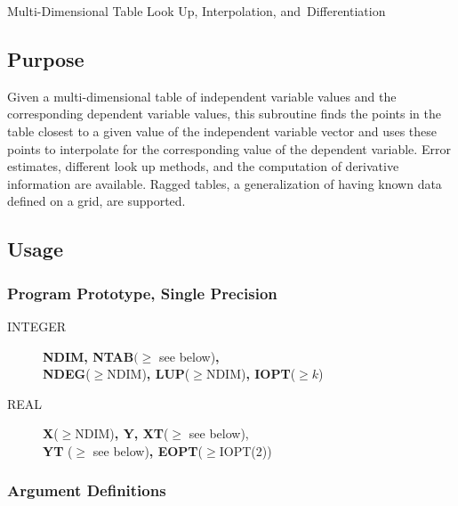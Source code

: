 \documentclass[twoside]{MATH77}
\begin{document}
 Multi-Dimensional Table Look Up, Interpolation,
\hbox{and Differentiation}


\subsection{Purpose}

Given a multi-dimensional table of independent variable values and the
corresponding dependent variable values, this subroutine finds the points in
the table closest to a given value of the independent variable vector and
uses these points to interpolate for the corresponding value of the
dependent variable. Error estimates, different look up methods, and the
computation of derivative information are available.  Ragged tables,
a generalization of having known data defined on a grid, are
supported.
\subsection{Usage}

\subsubsection{Program Prototype, Single Precision}
\begin{description}
\item[INTEGER]  {\bf NDIM, NTAB}$(\geq $ see below){\bf ,\\
NDEG}($\geq $NDIM){\bf , LUP}($\geq $NDIM){\bf , IOPT}($\geq k$)

\item[REAL]  {\bf X}($\geq $NDIM){\bf , Y, XT}($\geq $ see below),\\ {\bf YT}%
($\geq $ see below){\bf , EOPT}($\geq $IOPT(2))
\end{description}\vspace{-5pt}
\begin{center}
\end{center}\vspace{-5pt}
\subsubsection{Argument Definitions}
\end{document}
